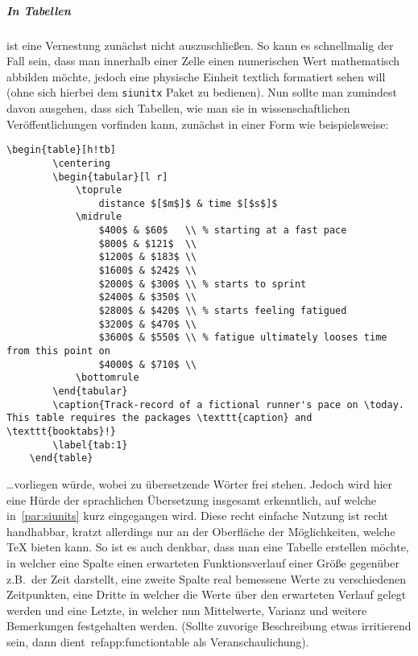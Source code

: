 \subparagraph{In Tabellen} ist eine Vernestung zunächst nicht auszuschließen. So kann es schnellmalig der Fall sein, dass man innerhalb einer Zelle einen numerischen Wert mathematisch abbilden möchte, jedoch eine physische Einheit textlich formatiert sehen will (ohne sich hierbei dem \texttt{siunitx} Paket zu bedienen). %
Nun sollte man zumindest davon ausgehen, dass sich Tabellen, wie man sie in wissenschaftlichen Veröffentlichungen vorfinden kann, zunächst in einer Form wie beispielsweise: 
\begin{Verbatim}[breaklines=true, breakanywhere=true]
    \begin{table}[h!tb]
        \centering
        \begin{tabular}[l r]
            \toprule
                distance $[$m$]$ & time $[$s$]$
            \midrule
                $400$ & $60$   \\ % starting at a fast pace
                $800$ & $121$  \\
                $1200$ & $183$ \\
                $1600$ & $242$ \\
                $2000$ & $300$ \\ % starts to sprint
                $2400$ & $350$ \\
                $2800$ & $420$ \\ % starts feeling fatigued
                $3200$ & $470$ \\
                $3600$ & $550$ \\ % fatigue ultimately looses time from this point on
                $4000$ & $710$ \\ 
            \bottomrule
        \end{tabular}
        \caption{Track-record of a fictional runner's pace on \today. This table requires the packages \texttt{caption} and \texttt{booktabs}!}
        \label{tab:1}
    \end{table}
\end{Verbatim}
\ldots vorliegen würde, wobei zu übersetzende Wörter frei stehen. Jedoch wird hier eine Hürde der sprachlichen Übersetzung insgesamt erkenntlich, auf welche in~\ref{par:siunits} kurz eingegangen wird. Diese recht einfache Nutzung ist recht handhabbar, kratzt allerdings nur an der Oberfläche der Möglichkeiten, welche \TeX{} bieten kann. 
So ist es auch denkbar, dass man eine Tabelle erstellen möchte, in welcher eine Spalte einen erwarteten Funktionsverlauf einer Größe gegenüber z.B.\ der Zeit darstellt, eine zweite Spalte real bemessene Werte zu verschiedenen Zeitpunkten, eine Dritte in welcher die Werte über den erwarteten Verlauf gelegt werden und eine Letzte, in welcher nun Mittelwerte, Varianz und weitere Bemerkungen festgehalten werden. (Sollte zuvorige Beschreibung etwas irritierend sein, dann dient~ref{app:functiontable} als Veranschaulichung). %


